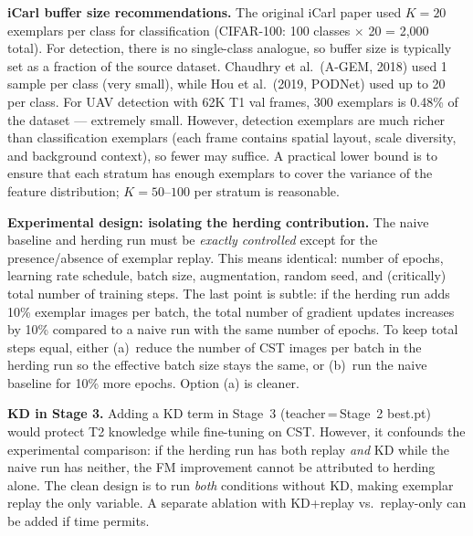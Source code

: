 \textbf{iCarl buffer size recommendations.}
The original iCarl paper used $K=20$ exemplars per class for
classification (CIFAR-100: 100 classes $\times$ 20 = 2,000 total).
For detection, there is no single-class analogue, so buffer size
is typically set as a fraction of the source dataset. Chaudhry
et al.\ (A-GEM, 2018) used 1 sample per class (very small), while
Hou et al.\ (2019, PODNet) used up to 20 per class. For UAV
detection with 62K T1 val frames, 300 exemplars is 0.48\% of the
dataset --- extremely small. However, detection exemplars are much
richer than classification exemplars (each frame contains spatial
layout, scale diversity, and background context), so fewer may
suffice. A practical lower bound is to ensure that each stratum
has enough exemplars to cover the variance of the feature
distribution; $K=50$--$100$ per stratum is reasonable.

\textbf{Experimental design: isolating the herding contribution.}
The naive baseline and herding run must be \emph{exactly controlled}
except for the presence/absence of exemplar replay. This means
identical: number of epochs, learning rate schedule, batch size,
augmentation, random seed, and (critically) total number of
training steps. The last point is subtle: if the herding run adds
10\% exemplar images per batch, the total number of gradient
updates increases by 10\% compared to a naive run with the same
number of epochs. To keep total steps equal, either (a)~reduce
the number of CST images per batch in the herding run so the
effective batch size stays the same, or (b)~run the naive baseline
for 10\% more epochs. Option (a) is cleaner.

\textbf{KD in Stage 3.}
Adding a KD term in Stage~3 (teacher\,=\,Stage~2 best.pt) would
protect T2 knowledge while fine-tuning on CST. However, it
confounds the experimental comparison: if the herding run has
both replay \emph{and} KD while the naive run has neither, the
FM improvement cannot be attributed to herding alone. The clean
design is to run \emph{both} conditions without KD, making
exemplar replay the only variable. A separate ablation with
KD+replay vs.\ replay-only can be added if time permits.

